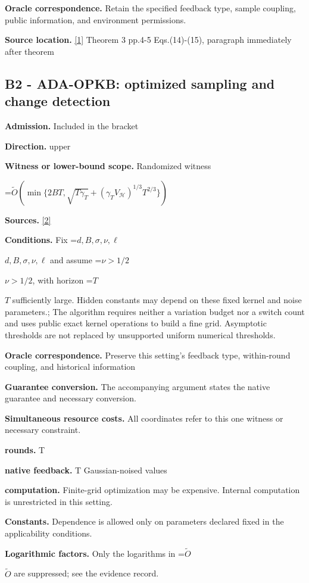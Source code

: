 \documentclass[10pt,a4paper]{article}
\newcommand{\AtlasMath}[1]{\par\begingroup\centering\setbox0=\hbox{$\displaystyle #1$}\ifdim\wd0>1.4\linewidth\typeout{ATLAS WIDE FORMULA: \the\wd0}\fi\ifdim\wd0>\linewidth\resizebox{\linewidth}{!}{\box0}\else\box0\fi\par\endgroup}
\newcommand{\AtlasInlineMath}[1]{\begingroup\setbox0=\hbox{$#1$}\ifdim\wd0>.4\linewidth\endgroup\AtlasMath{#1}\else\endgroup$#1$\fi}
\begin{document}
\textbf{Oracle correspondence.} Retain the specified feedback type, sample coupling, public information, and environment permissions.

\textbf{Source location.} \href{https://raw.githubusercontent.com/mlresearch/v258/main/assets/cai25a/cai25a.pdf}{[1]} Theorem 3 pp.4-5 Eqs.(14)-(15), paragraph immediately after theorem

\subsection{B2 - ADA-OPKB: optimized sampling and change detection}
\textbf{Admission.} Included in the bracket

\textbf{Direction.} upper

\textbf{Witness or lower-bound scope.} Randomized witness

\AtlasMath{\widetilde{O}\!\left(\min\{2BT,\sqrt{T\gamma_T}+(\gamma_T V_{\mathcal{H}})^{1/3}T^{2/3}\}\right)}
\textbf{Sources.} \href{https://proceedings.mlr.press/v206/hong23b.html}{[2]}

\textbf{Conditions.} Fix \AtlasInlineMath{d,B,\sigma,\nu,\ell} and assume \AtlasInlineMath{\nu>1/2}, with horizon \AtlasInlineMath{T} sufficiently large. Hidden constants may depend on these fixed kernel and noise parameters.; The algorithm requires neither a variation budget nor a switch count and uses public exact kernel operations to build a fine grid. Asymptotic thresholds are not replaced by unsupported uniform numerical thresholds.

\textbf{Oracle correspondence.} Preserve this setting's feedback type, within-round coupling, and historical information

\textbf{Guarantee conversion.} The accompanying argument states the native guarantee and necessary conversion.

\textbf{Simultaneous resource costs.} All coordinates refer to this one witness or necessary constraint.

\textbf{rounds.} T

\textbf{native feedback.} T Gaussian-noised values

\textbf{computation.} Finite-grid optimization may be expensive. Internal computation is unrestricted in this setting.

\textbf{Constants.} Dependence is allowed only on parameters declared fixed in the applicability conditions.

\textbf{Logarithmic factors.} Only the logarithms in \AtlasInlineMath{\widetilde O} are suppressed; see the evidence record.
\end{document}
